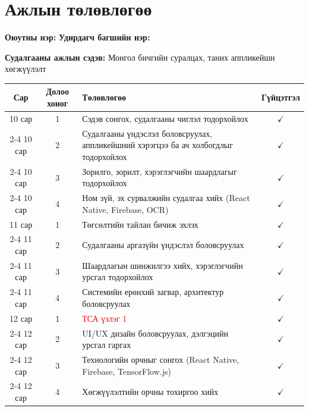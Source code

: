 \section*{Ажлын төлөвлөгөө}
\label{sec:plan}

\noindent\textbf{Оюутны нэр:} \authorshort \hfill \textbf{Удирдагч багшийн нэр:} \supervisor

\noindent\textbf{Судалгааны ажлын сэдэв:} Монгол бичгийн суралцах, таних аппликейшн хөгжүүлэлт

\vspace{0.3cm}

\begin{table}[H]
\centering
\scriptsize
\renewcommand{\arraystretch}{1.1}
\setlength{\tabcolsep}{3pt}

\begin{tabular}{|c|c|l|c|}
\hline
\textbf{Сар} & \textbf{Долоо хоног} & \textbf{Төлөвлөгөө} & \textbf{Гүйцэтгэл} \\
\hline

10 сар & 1 & Сэдэв сонгох, судалгааны чиглэл тодорхойлох & $\checkmark$ \\
\cline{2-4}
10 сар & 2 & Судалгааны үндэслэл боловсруулах, аппликейшний хэрэгцээ ба ач холбогдлыг тодорхойлох & $\checkmark$ \\
\cline{2-4}
10 сар & 3 & Зорилго, зорилт, хэрэглэгчийн шаардлагыг тодорхойлох & $\checkmark$ \\
\cline{2-4}
10 сар & 4 & Ном зүй, эх сурвалжийн судалгаа хийх (React Native, Firebase, OCR) & $\checkmark$ \\
\hline

11 сар & 1 & Төгсөлтийн тайлан бичиж эхлэх & $\checkmark$ \\
\cline{2-4}
11 сар & 2 & Судалгааны аргазүйн үндэслэл боловсруулах & $\checkmark$ \\
\cline{2-4}
11 сар & 3 & Шаардлагын шинжилгээ хийх, хэрэглэгчийн урсгал тодорхойлох & $\checkmark$ \\
\cline{2-4}
11 сар & 4 & Системийн ерөнхий загвар, архитектур боловсруулах & $\checkmark$ \\
\hline

12 сар & 1 & \textcolor{red}{ТСА үзлэг 1} & $\checkmark$ \\
\cline{2-4}
12 сар & 2 & UI/UX дизайн боловсруулах, дэлгэцийн урсгал гаргах & $\checkmark$ \\
\cline{2-4}
12 сар & 3 & Технологийн орчныг сонгох (React Native, Firebase, TensorFlow.js) & $\checkmark$ \\
\cline{2-4}
12 сар & 4 & Хөгжүүлэлтийн орчны тохиргоо хийх & $\checkmark$ \\
\hline


\end{tabular}
\end{table}
